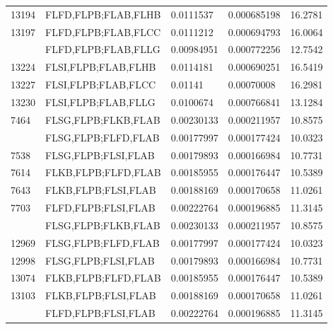 \documentclass[11pt,]{article}
\begin{document}
\begin{longtable}[t]{lllll}
13194 & FLFD,FLPB;FLAB,FLHB & 0.0111537 & 0.000685198 & 16.2781\\
13197 & FLFD,FLPB;FLAB,FLCC & 0.0111212 & 0.000694793 & 16.0064\\
\addlinespace
13200 & FLFD,FLPB;FLAB,FLLG & 0.00984951 & 0.000772256 & 12.7542\\
13224 & FLSI,FLPB;FLAB,FLHB & 0.0114181 & 0.000690251 & 16.5419\\
13227 & FLSI,FLPB;FLAB,FLCC & 0.01141 & 0.00070008 & 16.2981\\
13230 & FLSI,FLPB;FLAB,FLLG & 0.0100674 & 0.000766841 & 13.1284\\
7464 & FLSG,FLPB;FLKB,FLAB & 0.00230133 & 0.000211957 & 10.8575\\
\addlinespace
7509 & FLSG,FLPB;FLFD,FLAB & 0.00177997 & 0.000177424 & 10.0323\\
7538 & FLSG,FLPB;FLSI,FLAB & 0.00179893 & 0.000166984 & 10.7731\\
7614 & FLKB,FLPB;FLFD,FLAB & 0.00185955 & 0.000176447 & 10.5389\\
7643 & FLKB,FLPB;FLSI,FLAB & 0.00188169 & 0.000170658 & 11.0261\\
7703 & FLFD,FLPB;FLSI,FLAB & 0.00222764 & 0.000196885 & 11.3145\\
\addlinespace
12924 & FLSG,FLPB;FLKB,FLAB & 0.00230133 & 0.000211957 & 10.8575\\
12969 & FLSG,FLPB;FLFD,FLAB & 0.00177997 & 0.000177424 & 10.0323\\
12998 & FLSG,FLPB;FLSI,FLAB & 0.00179893 & 0.000166984 & 10.7731\\
13074 & FLKB,FLPB;FLFD,FLAB & 0.00185955 & 0.000176447 & 10.5389\\
13103 & FLKB,FLPB;FLSI,FLAB & 0.00188169 & 0.000170658 & 11.0261\\
\addlinespace
13163 & FLFD,FLPB;FLSI,FLAB & 0.00222764 & 0.000196885 & 11.3145\\*
\end{longtable}
\end{document}
